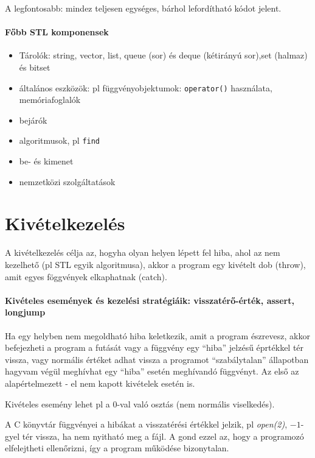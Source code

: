\documentclass[fleqn,10pt,a4paper]{article}
\newcommand{\ut}[1]{\texttt{#1}}
\theoremstyle{magyar}
\begin{document}
  A legfontosabb: mindez teljesen egységes, bárhol lefordítható kódot jelent.

  \paragraph{Főbb STL komponensek}
  \begin{itemize}
  \item Tárolók: string, vector, list, queue (sor) és  deque
    (kétirányú sor),set (halmaz) és bitset
  \item általános eszközök: pl függvényobjektumok: \ut{operator()}
  használata, memóriafoglalók
  
  \item bejárók
  \item algoritmusok, pl \ut{find}
  \item be- és kimenet
  \item nemzetközi szolgáltatások
    
  \end{itemize}
  
  \newpage
  \section{Kivételkezelés}
  A kivételkezelés célja az, hogyha olyan helyen lépett fel hiba, ahol
  az nem kezelhető (pl STL egyik algoritmusa), akkor a program egy
  kivételt dob (throw), amit egyes föggvények elkaphatnak (catch).

  \paragraph[Kivételes események és kivételkezelési
    statégiák]{Kivételes események és kezelési stratégiáik:
    visszatérő-érték, assert, longjump}
  Ha egy helyben nem megoldható hiba keletkezik, amit a program
  észrevesz, akkor befejezheti a program a futását vagy a függvény
  egy ``hiba'' jelzésű éprtékkel tér vissza, vagy normális értéket
  adhat vissza a programot ``szabálytalan'' állapotban hagyvam végül
  meghívhat egy ``hiba'' esetén meghívandó függvényt.
  Az első az alapértelmezett - el nem kapott kivételek esetén is.
  
  Kivételes esemény lehet pl a 0-val való osztás (nem normális viselkedés).
  
  A C könyvtár függvényei a hibákat a visszatérési értékkel jelzik, pl
  \emph{open(2)}, $-1$-gyel tér vissza, ha nem nyitható meg a fájl. A
  gond ezzel az, hogy a programozó elfelejtheti ellenőrizni, így a
  program működése bizonytalan.
\end{document}
